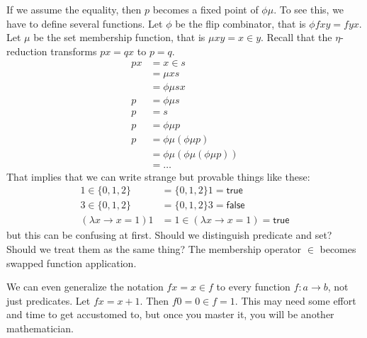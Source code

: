 \documentclass[10pt,statementpaper]{memoir}
\theoremstyle{definition}
\newcommand\true{\mathsf{true}}
\newcommand\false{\mathsf{false}}
\begin{document}
If we assume the equality, then $p$ becomes a fixed point of $\phi \mu$.
To see this, we have to define several functions.
Let $\phi$ be the flip combinator, that is $\phi f x y = f y x$.
Let $\mu$ be the set membership function, that is $\mu x y = x \in y$.
Recall that the $\eta$-reduction transforms $p x = q x$ to $p = q$.
\begin{align*}
    p x &= x \in s
    \\
    &= \mu x s
    \\
    &= \phi \mu s x
    \\
    p &= \phi \mu s
    \\
    p &= s
    \\
    p &= \phi \mu p
    \\
    p &= \phi \mu (\phi \mu p)
    \\
    &= \phi \mu (\phi \mu (\phi \mu p))
    \\
    &= \ldots
\end{align*}
That implies that we can write strange but provable things like these:
\begin{align*}
    1 \in \{0,1,2\} &= \{0,1,2\} 1 = \true
    \\
    3 \in \{0,1,2\} &= \{0,1,2\} 3 = \false
    \\
    (\lambda x \to x = 1) 1 &= 1 \in (\lambda x \to x = 1) = \true
\end{align*}
but this can be confusing at first.
Should we distinguish predicate and set?
Should we treat them as the same thing?
The membership operator $\in$ becomes swapped function application.

We can even generalize the notation $f x = x \in f$ to every function $f : a \to b$, not just predicates.
Let $f x = x + 1$. Then $f 0 = 0 \in f = 1$.
This may need some effort and time to get accustomed to,
but once you master it, you will be another mathematician.
\end{document}
